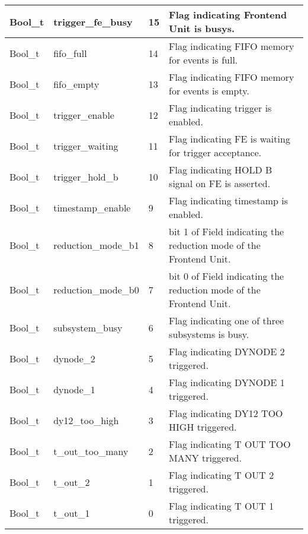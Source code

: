 \documentclass[a4paper, 12pt, onecolumn]{article}
\begin{document}
\begin{center}
  \label{tab:event-status-bit}    
  \tablelasttail{\hline}
  \begin{supertabular}{| p{15mm} | p{34mm} | p{7mm} | p{63mm} |}
    Bool\_t   & trigger\_fe\_busy       & 15  & Flag indicating Frontend Unit is busys. \\\hline
    Bool\_t   & fifo\_full              & 14  & Flag indicating FIFO memory for events is full. \\\hline
    Bool\_t   & fifo\_empty             & 13  & Flag indicating FIFO memory for events is empty. \\\hline
    Bool\_t   & trigger\_enable         & 12  & Flag indicating trigger is enabled. \\\hline
    Bool\_t   & trigger\_waiting        & 11  & Flag indicating FE is waiting for trigger acceptance. \\\hline
    Bool\_t   & trigger\_hold\_b        & 10  & Flag indicating HOLD B signal on FE is asserted. \\\hline
    Bool\_t   & timestamp\_enable 	    & 9   & Flag indicating timestamp is enabled. \\\hline
    Bool\_t   & reduction\_mode\_b1     & 8   & bit 1 of Field indicating the reduction mode of the Frontend Unit. \\\hline
    Bool\_t   & reduction\_mode\_b0     & 7   & bit 0 of Field indicating the reduction mode of the Frontend Unit. \\\hline
    Bool\_t   & subsystem\_busy         & 6   & Flag indicating one of three subsystems is busy. \\\hline
    Bool\_t   & dynode\_2               & 5   & Flag indicating DYNODE 2 triggered. \\\hline
    Bool\_t   & dynode\_1               & 4   & Flag indicating DYNODE 1 triggered. \\\hline
    Bool\_t   & dy12\_too\_high         & 3   & Flag indicating DY12 TOO HIGH triggered. \\\hline
    Bool\_t   & t\_out\_too\_many       & 2   & Flag indicating T OUT TOO MANY triggered. \\\hline
    Bool\_t   & t\_out\_2               & 1   & Flag indicating T OUT 2 triggered. \\\hline
    Bool\_t   & t\_out\_1               & 0   & Flag indicating T OUT 1 triggered. \\
  \end{supertabular}
\end{center}
\end{document}
